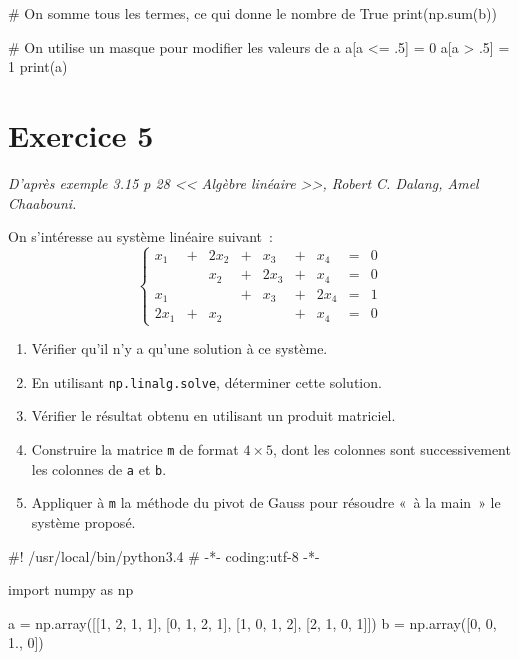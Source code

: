 \documentclass[10pt,fleqn]{article} %
\begin{document}
\begin{multicols}{2}
\begin{corrige}
\begin{python}
# On somme tous les termes, ce qui donne le nombre de True
print(np.sum(b))

# On utilise un masque pour modifier les valeurs de a
a[a <= .5] = 0
a[a > .5] = 1
print(a)

\end{python}
\end{corrige}
\else
\fi

\section*{Exercice 5}
\textit{D'après exemple 3.15 p 28 << Algèbre linéaire >>, Robert C. Dalang, Amel Chaabouni.}

On s'intéresse au système linéaire suivant~: 
\[
\left\{
  \begin{array}{rcrcrcrcl}
    x_1 & + & 2x_2 & + & x_3 & + & x_4 & = & 0 \\
    & & x_2 & + & 2x_3 & + & x_4 & = & 0 \\
    x_1 & & & + & x_3 & + & 2x_4 & = & 1 \\
    2x_1 & + & x_2 & & & + & x_4 & = & 0 
  \end{array}
\right.
\]
\begin{enumerate}
\item 
  Vérifier qu'il n'y a qu'une solution à ce système.

\item 
  En utilisant \texttt{np.linalg.solve}, déterminer cette solution.

\item 
  Vérifier le résultat obtenu en utilisant un produit matriciel.

\item 
  Construire la matrice \texttt{m} de format $4\times 5$, dont les
  colonnes sont successivement les colonnes de \texttt{a} et
  \texttt{b}.

\item 
  Appliquer à \texttt{m} la méthode du pivot de Gauss pour résoudre
  «~à la main~» le
  système proposé.
  
\end{enumerate}
\ifprof 
\begin{corrige}
\begin{python}
#! /usr/local/bin/python3.4
# -*- coding:utf-8 -*-
    
import numpy as np

a = np.array([[1, 2, 1, 1],
              [0, 1, 2, 1],
              [1, 0, 1, 2],
              [2, 1, 0, 1]])
b = np.array([0, 0, 1., 0])


\end{python}
\end{corrige}
\end{multicols}
\end{document}
